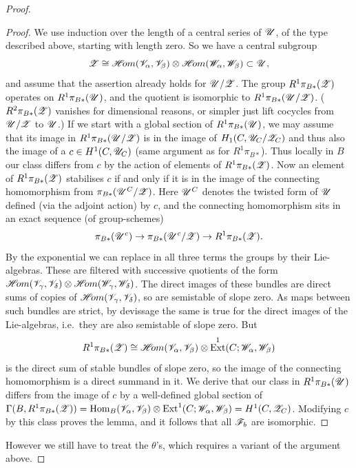 \documentclass[12pt,english]{smfart}
\newcommand{\shHom}{\mathscr{H}\!om} \newcommand{\shEnd}{\mathscr{E}\!nd} \newcommand{\shAut}{\mathfrak{A}ut} \newcommand{\End}{\mathscr{E}\!nd} \newcommand{\Isom}{\mathscr{I}\!som} \newcommand{\Char}{\mathscr{C}\!har} \newcommand{\Conn}{\mathscr{C}\!onn} \newcommand{\Diff}{\mathscr{D}\!iff} \newcommand{\Bor}{\mathscr{B}or} \newcommand{\Flag}{\mathscr{F}\!lag} \renewcommand{\Im}{\mathscr{I}\!m}
\DeclareMathOperator{\Hom}{Hom} \DeclareMathOperator{\Ext}{Ext} \DeclareMathOperator{\Der}{Der} \DeclareMathOperator{\rank}{rank} \DeclareMathOperator{\rk}{rk} \DeclareMathOperator{\Spec}{Spec} \DeclareMathOperator{\depth}{depth} \DeclareMathOperator{\genus}{genus} \DeclareMathOperator{\Lie}{Lie} \DeclareMathOperator{\Ad}{Ad} \DeclareMathOperator{\ad}{ad} \DeclareMathOperator{\id}{id} \DeclareMathOperator{\tr}{tr} \DeclareMathOperator{\ch}{ch} \DeclareMathOperator{\Td}{Td} \DeclareMathOperator{\gr}{gr} \DeclareMathOperator{\Pic}{Pic} \DeclareMathOperator{\Aut}{Aut} \DeclareMathOperator{\Out}{Out} \DeclareMathOperator{\Gal}{Gal} \DeclareMathOperator{\PGL}{PGL} \DeclareMathOperator{\GL}{GL} \DeclareMathOperator{\SL}{SL} \DeclareMathOperator{\Ima}{Im} \newcommand{\HDR}{H_{\mathrm{DR}}} \newcommand{\Mpar}{\sM^{0}_{\theta}(\sG)_{\mathrm{par}}}
\theoremstyle{plain} \newtheorem{innerthm}{Theorem} \newtheorem{innerlem}{Lemma} \newtheorem{innerprop}{Proposition} \newtheorem{innercor}{Corollary} \theoremstyle{definition} \newtheorem{innerdefn}{Definition} \newtheorem{innerconstr}{Construction} \theoremstyle{remark} \newtheorem*{remark}{Remark} \newtheorem*{remarks}{Remarks} \newtheorem*{applications}{Applications}
\begin{document}
\begin{proof}
\begin{proof}
We use induction over the length of a central series of $\mathscr{U}$, of the type described above, starting with length zero. So we have a central subgroup
\[
\sZ\cong\shHom(\sV_\alpha,\sV_\beta)\otimes\shHom(\sW_\alpha,\sW_\beta)\subset\sU,
\]
and assume that the assertion already holds for $\mathscr{U}/\mathscr{Z}$. The group $R^1\pi_{B*}(\mathscr{Z})$ operates on $R^1\pi_{B*}(\mathscr{U})$, and the quotient is isomorphic to $R^1\pi_{B*}(\mathscr{U}/\mathscr{Z})$. ($R^2\pi_{B*}(\mathscr{Z})$ vanishes for dimensional reasons, or simpler just lift cocycles from $\mathscr{U}/\mathscr{Z}$ to $\mathscr{U}$.) If we start with a global section of $R^1\pi_{B*}(\mathscr{U})$, we may assume that its image in $R^1\pi_{B*}(\mathscr{U}/\mathscr{Z})$ is in the image of $H_1(C,\mathscr{U}_C/\mathscr{Z}_C)$ and thus also the image of a $c\in H^1(C,\mathscr{U}_C)$ (same argument as for $R^1\pi_{B*}$). Thus locally in $B$ our class differs from $c$ by the action of elements of $R^1\pi_{B*}(\mathscr{Z})$. Now an element of $R^1\pi_{B*}(\mathscr{Z})$ stabilises $c$ if and only if it is in the image of the connecting homomorphism from $\pi_{B*}(\mathscr{U}^C/\mathscr{Z})$. Here $\mathscr{U}^C$ denotes the twisted form of $\mathscr{U}$ defined (via the adjoint action) by $c$, and the connecting homomorphism sits in an exact sequence (of group-schemes)
\[
\pi_{B*}(\mathscr{U}^c)\to\pi_{B*}(\mathscr{U}^c/\mathscr{Z})\to R^1\pi_{B*}(\mathscr{Z}).
\]
By the exponential we can replace in all three terms the groups by their Lie-algebras. These are filtered with successive quotients of the form $\shHom(\sV_\gamma,\sV_\delta)\otimes\shHom(\sW_\gamma,\sW_\delta)$. The direct images of these bundles are direct sums of copies of $\shHom(\sV_\gamma,\sV_\delta)$, so are semistable of slope zero. As maps between such bundles are strict, by devissage the same is true for the direct images of the Lie-algebras, i.e.\ they are also semistable of slope zero. But
\[
R^1\pi_{B*}(\sZ)\cong
\shHom(\sV_\alpha,\sV_\beta)\otimes\Ext^1(C;\sW_\alpha,\sW_\beta)
\]
is the direct sum of stable bundles of slope zero, so the image of the connecting homomorphism is a direct summand in it. We derive that our class in $R^1\pi_{B*}(\mathscr{U})$ differs from the image of $c$ by a well-defined global section of $\Gamma(B,R^1\pi_{B*}(\sZ))=\Hom_B(\sV_\alpha,\sV_\beta)\otimes \Ext^1(C;\sW_\alpha,\sW_\beta)=H^1(C,\sZ_C)$. Modifying $c$ by this class proves the lemma, and it follows that all $\mathscr{F}_b$ are isomorphic.
\end{proof}

However we still have to treat the $\theta$'s, which requires a variant of the argument above.


\end{proof}
\end{document}
